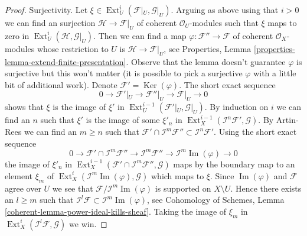 \documentclass[10pt,a4paper]{amsart}
\theoremstyle{plain}
\theoremstyle{definition}
\theoremstyle{remark}
\numberwithin{equation}{subsection}
\def\Ext{\mathop{\mathrm{Ext}}\nolimits}
\def\Ker{\mathop{\mathrm{Ker}}}
\def\Im{\mathop{\mathrm{Im}}}
\begin{document}
\begin{proof}
\medskip\noindent
Surjectivity. Let $\xi \in \Ext^i_U(\mathcal{F}|_U, \mathcal{G}|_U)$.
Arguing as above using that $i > 0$ we can find an surjection
$\mathcal{H} \to \mathcal{F}|_U$ of coherent $\mathcal{O}_U$-modules
such that $\xi$ maps to zero in $\Ext^i_U(\mathcal{H}, \mathcal{G}|_U)$.
Then we can find a map $\varphi : \mathcal{F}'' \to \mathcal{F}$
of coherent $\mathcal{O}_X$-modules whose restriction to $U$ is
$\mathcal{H} \to \mathcal{F}|_U$, see
Properties, Lemma \ref{properties-lemma-extend-finite-presentation}.
Observe that the lemma doesn't guarantee $\varphi$ is surjective
but this won't matter (it is possible to pick a surjective $\varphi$
with a little bit of additional work).
Denote $\mathcal{F}' = \Ker(\varphi)$. The short exact sequence
$$
0 \to \mathcal{F}'|_U \to \mathcal{F}''|_U \to \mathcal{F}|_U \to 0
$$
shows that $\xi$ is the image of $\xi'$ in
$\Ext^{i - 1}_U(\mathcal{F}'|_U, \mathcal{G}|_U)$.
By induction on $i$ we can find an $n$ such that
$\xi'$ is the image of some $\xi'_n$ in
$\Ext^{i - 1}_X(\mathcal{I}^n\mathcal{F}', \mathcal{G})$.
By Artin-Rees we can find an $m \geq n$ such that
$\mathcal{F}' \cap \mathcal{I}^m\mathcal{F}'' \subset
\mathcal{I}^n\mathcal{F}'$. Using the short exact sequence
$$
0 \to \mathcal{F}' \cap \mathcal{I}^m\mathcal{F}'' \to
\mathcal{I}^m\mathcal{F}'' \to \mathcal{I}^m\Im(\varphi) \to 0
$$
the image of $\xi'_n$ in
$\Ext^{i - 1}_X(\mathcal{F}' \cap \mathcal{I}^m\mathcal{F}'', \mathcal{G})$
maps by the boundary map to an element $\xi_m$ of
$\Ext^i_X(\mathcal{I}^m\Im(\varphi), \mathcal{G})$ which maps
to $\xi$. Since $\Im(\varphi)$ and $\mathcal{F}$ agree over $U$
we see that $\mathcal{F}/\mathcal{I}^m\Im(\varphi)$ is supported
on $X \setminus U$. Hence there exists an $l \geq m$
such that $\mathcal{I}^l\mathcal{F} \subset \mathcal{I}^m\Im(\varphi)$, see
Cohomology of Schemes, Lemma \ref{coherent-lemma-power-ideal-kills-sheaf}.
Taking the image of $\xi_m$ in
$\Ext^i_X(\mathcal{I}^l\mathcal{F}, \mathcal{G})$ we win.
\end{proof}
\end{document}
